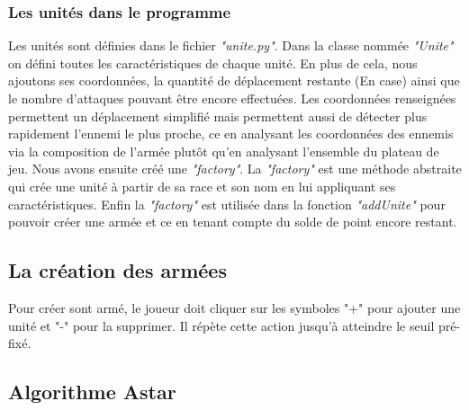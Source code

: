 \documentclass{article}
\begin{document}
  \subsubsection{Les unités dans le programme}
  Les unités sont définies dans le fichier \textit{"unite.py"}. Dans la classe nommée \textit{"Unite"} on défini toutes les caractéristiques de chaque unité. En plus de cela, nous ajoutons ses coordonnées, la quantité de déplacement restante (En case) ainsi que le nombre d'attaques pouvant être encore effectuées. Les coordonnées renseignées permettent un déplacement simplifié mais permettent aussi de détecter plus rapidement l'ennemi le plus proche, ce en analysant les coordonnées des ennemis via la composition de l'armée plutôt qu'en analysant l'ensemble du plateau de jeu.
Nous avons ensuite créé une \textit{"factory"}. La \textit{"factory"} est une méthode abstraite qui crée une unité à partir de sa race et son nom en lui appliquant ses caractéristiques. Enfin la \textit{"factory"} est utilisée dans la fonction \textit{"addUnite"} pour pouvoir créer une armée et ce en tenant compte du solde de point encore restant.
  
 \subsection{La création des armées}
 Pour créer sont armé, le joueur doit cliquer sur les symboles "+" pour ajouter une unité et "-" pour la supprimer. Il répète cette action jusqu'à atteindre le seuil pré-fixé.
  
\subsection{Algorithme Astar}
\end{document}
